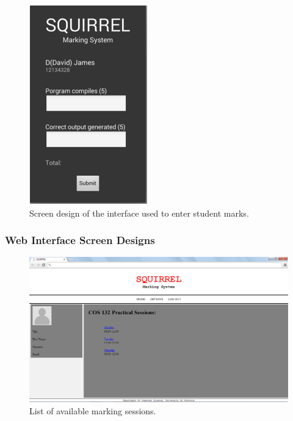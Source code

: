 \documentclass[11pt,a4paper]{article}
\begin{document}
		\begin{figure}[h!]
		\centering
		\includegraphics[width=0.7\linewidth]{./mobile_markStudent}
		\caption{Screen design of the interface used to enter student marks.}
		\label{fig:mobile_markStudent}
		\end{figure}
\pagebreak	

\subsubsection{Web Interface Screen Designs}
\begin{figure}[h!]
\centering
\includegraphics[width=1.0\linewidth]{./web_markerSessions}
\caption{List of available marking sessions.}
\label{fig:web_markerSessions}
\end{figure}
		
\end{document}
